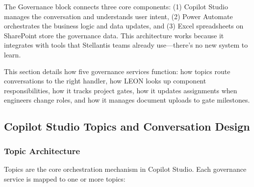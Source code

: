 The Governance block connects three core components: (1) Copilot Studio manages the conversation and understands user intent, (2) Power Automate orchestrates the business logic and data updates, and (3) Excel spreadsheets on SharePoint store the governance data. This architecture works because it integrates with tools that Stellantis teams already use—there's no new system to learn.

This section details how five governance services function: how topics route conversations to the right handler, how LEON looks up component responsibilities, how it tracks project gates, how it updates assignments when engineers change roles, and how it manages document uploads to gate milestones.

\vspace{0.3cm}
\noindent{}
\vspace{0.3cm}

\subsection{\textcolor[HTML]{003D99}{Copilot Studio Topics and Conversation Design}}
\label{sec:impl-topics}

\subsubsection{\textcolor[HTML]{0066CC}{Topic Architecture}}

Topics are the core orchestration mechanism in Copilot Studio. Each governance service is mapped to one or more topics:

